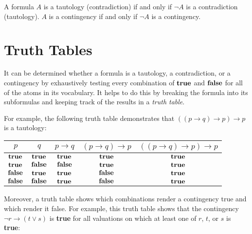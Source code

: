 \documentclass{article}
\begin{document}
\begin{proposition}
A formula $A$ is a tautology (contradiction) if and only if $\neg A$ is a contradiction (tautology). $A$ is a contingency if and only if $\neg A$ is a contingency.
\end{proposition}

\section*{Truth Tables}

It can be determined whether a formula is a tautology, a contradiction, or a contingency by exhaustively testing every combination of $\mathbf{true}$ and $\mathbf{false}$ for all of the atoms in its vocabulary. It helps to do this by breaking the formula into its subformulas and keeping track of the results in a \textit{truth table}.

For example, the following truth table demonstrates that $((p \to q) \to p) \to p$ is a tautology:

\begin{center}
\begin{tabular}{c|c||c|c|c}
    $p$ & $q$ & $p \to q$ & $(p \to q) \to p$ & $((p \to q) \to p) \to p$ \\
    \hline
    $\mathbf{true}$  & $\mathbf{true}$  & $\mathbf{true}$  & $\mathbf{true}$  & $\mathbf{true}$ \\
    $\mathbf{true}$  & $\mathbf{false}$ & $\mathbf{false}$ & $\mathbf{true}$  & $\mathbf{true}$ \\
    $\mathbf{false}$ & $\mathbf{true}$  & $\mathbf{true}$  & $\mathbf{false}$ & $\mathbf{true}$ \\
    $\mathbf{false}$ & $\mathbf{false}$ & $\mathbf{true}$  & $\mathbf{false}$ & $\mathbf{true}$ \\
\end{tabular}
\end{center}

Moreover, a truth table shows which combinations render a contingency true and which render it false. For example, this truth table shows that the contingency $\neg r \to (t \vee s)$ is \textbf{true} for all valuations on which at least one of $r$, $t$, or $s$ is \textbf{true}:
\end{document}

